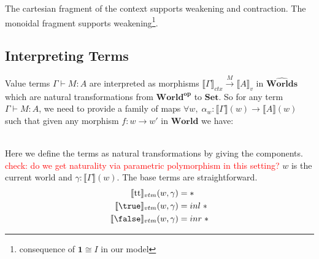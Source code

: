 \documentclass{article}
\newcommand{\red}[1]{\textcolor{red}{#1}}
\newcommand{\ttt}{\textrm{tt}}
\newcommand{\worlds}{\widehat{\mathbf{Worlds}}}
\begin{document}
The cartesian fragment of the context supports weakening and contraction. The monoidal fragment supports weakening\footnote{consequence of $\mathbf{1} \cong I$ in our model}.


\subsection{Interpreting Terms}
Value terms $\Gamma \vdash M : A$ are interpreted as morphisms $\llbracket \Gamma \rrbracket_{ctx} \xrightarrow{M} \llbracket A \rrbracket_{v}$ in $\worlds$ which are natural transformations from $\mathbf{World^{op}}$ to $\mathbf{Set}$. So for any term $\Gamma \vdash M : A$, we need to provide a family of maps $\forall w ,\; \alpha_w : \llbracket \Gamma \rrbracket(w) \rightarrow \llbracket A \rrbracket(w)$ such that given any morphism $f : w \rightarrow w'$ in $\mathbf{World}$ we have:
\begin{figure}[!h]
    \centering

\end{figure}\\
Here we define the terms as natural transformations by giving the components. \red{check: do we get naturality via parametric polymorphism in this setting?} $w$ is the current world and $\gamma : \llbracket \Gamma \rrbracket(w)$. The base terms are straightforward. 
\begin{align*}
    \llbracket  \ttt \rrbracket_{vtm}(w, \gamma) &= *\\
    \llbracket  \true \rrbracket_{vtm}(w,\gamma) &= inl \;*\\
    \llbracket  \false \rrbracket_{vtm}(w,\gamma) &= inr \;*\\
\end{align*}
\end{document}
